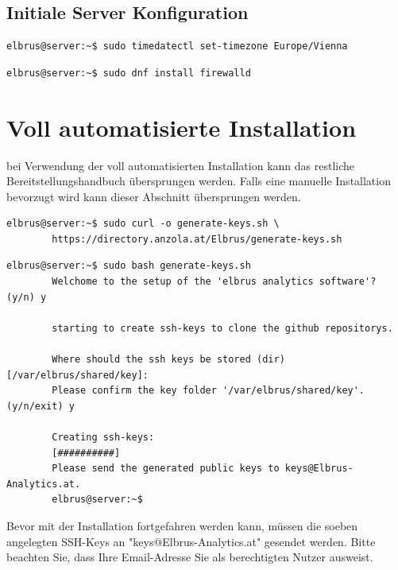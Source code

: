 \documentclass{article}
\begin{document}
	\subsection{Initiale Server Konfiguration}

	\lstset{style=commands}
	\begin{lstlisting}[caption={Setzen der Zeitzone auf 'Europa/Wien'.}]
		elbrus@server:~$ sudo timedatectl set-timezone Europe/Vienna
	\end{lstlisting}

	\lstset{style=commands}
	\begin{lstlisting}[caption={Installieren von dem 'firewalld' Service.}]
		elbrus@server:~$ sudo dnf install firewalld
	\end{lstlisting}
	\newpage
	
	\section{Voll automatisierte Installation}
	bei Verwendung der voll automatisierten Installation kann das restliche Bereitstellungshandbuch übersprungen werden. Falls eine manuelle Installation bevorzugt wird kann dieser Abschnitt übersprungen werden.
	
	\lstset{style=commands}
	\begin{lstlisting}[caption={Installieren des 'generate-keys' Script.}]
		elbrus@server:~$ sudo curl -o generate-keys.sh \
		https://directory.anzola.at/Elbrus/generate-keys.sh
	\end{lstlisting}

	\lstset{style=commands}
	\begin{lstlisting}[caption={Ausführen des 'generate-keys' Script.}]
		elbrus@server:~$ sudo bash generate-keys.sh
		Welchome to the setup of the 'elbrus analytics software'? (y/n) y
		
		starting to create ssh-keys to clone the github repositorys.
		
		Where should the ssh keys be stored (dir) [/var/elbrus/shared/key]:
		Please confirm the key folder '/var/elbrus/shared/key'. (y/n/exit) y
		
		Creating ssh-keys:
		[##########]
		Please send the generated public keys to keys@Elbrus-Analytics.at.
		elbrus@server:~$
	\end{lstlisting}
	
	Bevor mit der Installation fortgefahren werden kann, müssen die soeben angelegten SSH-Keys an "keys@Elbrus-Analytics.at" gesendet werden. Bitte beachten Sie, dass Ihre Email-Adresse Sie als berechtigten Nutzer ausweist.
	\newpage
	
\end{document}
